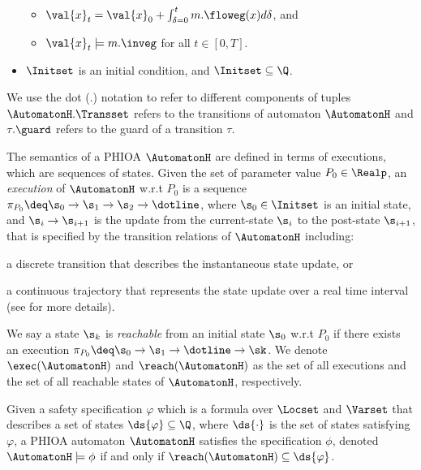 \begin{definition}
\begin{itemize}[leftmargin= 2em]
\begin{itemize}
\item $\val{x}_t = \val{x}_0 + \int_{\delta = 0}^{t} m.\floweg(x) d\delta$, and %
\item $\val{x}_t \models m.\inveg$ for all $t \in [0, T]$.
%
\end{itemize}
%
\item $\Initset$ is an initial condition, and $\Initset \subseteq \Q$.
\end{itemize}
\end{definition}
% 
We use the dot (.) notation to refer to different components of tuples \eg $\AutomatonH.\Transset$ refers to the transitions of automaton $\AutomatonH$ and $\tau.\guard$ refers to the guard of a transition $\tau$.

The semantics of a PHIOA $\AutomatonH$ are defined in terms of executions, which are sequences of states. Given the set of parameter value $P_0\in \Realp$, an \emph{execution} of $\AutomatonH$ w.r.t $P_0$ is a sequence $\pi_{P_0} \deq \s_0 \rightarrow \s_1 \rightarrow \s_2 \rightarrow \dotline$, where $\s_0 \in \Initset$ is an initial state, and $\s_i \rightarrow \s_{i+1}$ is the update from the current-state $\s_i$ to the post-state $\s_{i+1}$, that is specified by the transition relations of $\AutomatonH$ including:
\begin{inparaenum}[(a)]
\item a discrete transition that describes the instantaneous state update, or
\item a continuous trajectory that represents the state update over a real time interval (see \cite{david2010timed,frehse2008counterexample} for more details).
\end{inparaenum}
%
%
We say a state $\s_k$ is \emph{reachable} from an initial state $\s_0$ w.r.t $P_0$ if there exists an execution $\pi_{P_0} \deq \s_0 \rightarrow \s_1 \rightarrow \dotline \rightarrow \sk$. We denote $\exec(\AutomatonH)$ and $\reach(\AutomatonH)$  as the set of all executions and the set of all reachable states of $\AutomatonH$, respectively.

\begin{definition}
Given a safety specification $\varphi$ which is a formula over $\Locset$ and $\Varset$ that describes a set of states $\ds{\varphi} \subseteq \Q$, where $\ds{\cdot}$ is the set of states satisfying $\varphi$, a PHIOA automaton $\AutomatonH$ satisfies the specification $\phi$, denoted $\AutomatonH \models \phi$ if and only if $\reach(\AutomatonH) \subseteq \ds{\varphi}$.
\end{definition}

